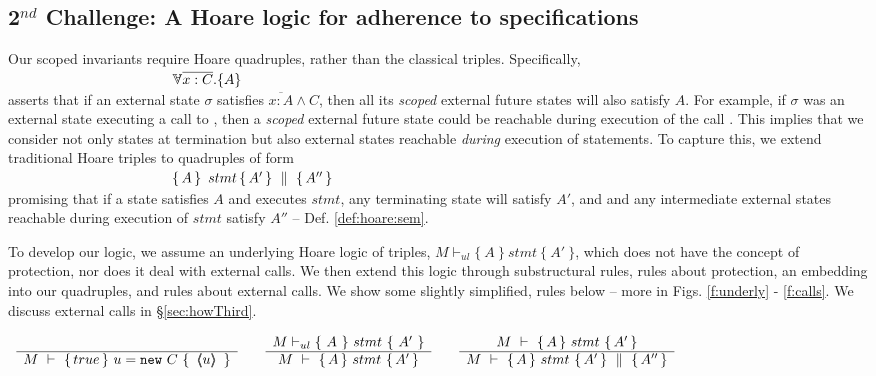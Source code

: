   
  \subsection{2$^{nd}$ Challenge:  A Hoare logic for adherence to specifications}  
 \label{sec:howSecond}

Our scoped invariants require Hoare   quadruples, rather than the classical triples.
Specifically, \\
  $\strut \ \hspace{4cm} {\TwoStatesN  {\overline{x:C}}  {A}}$\\
 asserts that if an external {state} $\sigma$ 
 satisfies $\overline {x:A} \wedge C$, then all its \emph{scoped} external future  states will  {also} satisfy  {$A$}. 
For example, if $\sigma$ was an external state executing a call to , then a \emph{scoped} external future  state
 could be reachable during execution of the   call .
This implies that we consider not only states at termination but also external states reachable
 \emph{during} execution of  statements. 
To  capture this, we extend   traditional Hoare triples to quadruples of  form\\
 $\strut \ \hspace{4cm} \quadruple {A} {\, stmt\, }{A'} {A''}$\\  
 promising that if a state satisfies $A$ and executes $stmt$, any terminating state will satisfy $A'$, and 
 and  any intermediate external states reachable during execution of $stmt$ satisfy    $A''$ -- \cf Def. \ref{def:hoare:sem}.
 
\vspace{.05cm}

To develop our logic, we   assume  an  underlying   Hoare logic  of  triples, 
$ M \vdash_{ul} \{ \ A\ \} {\ stmt\ }\{\ A'\ \} $,
which does not {have} the concept of protection, nor does it deal with external calls.
We then extend this logic through  
substructural rules,   rules about protection,  an embedding into our quadruples, and rules about external calls.
We show some  slightly simplified, rules below -- more in 
 Figs. \ref{f:underly} -  \ref{f:calls}.
 We discuss external calls in \S \ref{sec:howThird}.


{\footnotesize{
$
\begin{array}{lclcl}
\inferruleNoName 
	{ 
	 	
	}  	 
	{	 
 	\hproves  {M}  
	                {  true  }  
 			   {\  u = \prg{new}\ C \ }
 			   {\  \inside{u}\  } 
	} 
& &
\inferruleNoName 
	{
	 M \vdash_{ul} \{ \ A\ \} {\ stmt\ }\{\ A'\ \} 
	}  
	{ \hproves  {M}  {A} {\ stmt\ }{A'} }
	& &
\inferruleNoName 
	{  
	\hproves{M}  {A} {\ stmt \ } {A'} 
	}
	{\hprovesN{M}  {A} {\ stmt \ } {A'} {A''} }
\end{array}
$
}}

